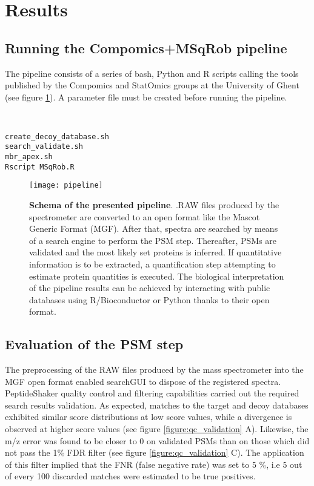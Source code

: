 \section{Results}

\subsection{Running the Compomics+MSqRob pipeline}

The pipeline consists of a series of bash, Python and R scripts calling the tools published by the Compomics and StatOmics groups at the University of Ghent (see figure \ref{fig:pipeline}). A parameter file must be created before running the pipeline.

\begin{verbatim}


create_decoy_database.sh
search_validate.sh
mbr_apex.sh
Rscript MSqRob.R

\end{verbatim}


\begin{figure}[!h]
\texttt{[image: pipeline]}
\caption[Schema of the presented pipeline]{\textbf{Schema of the presented pipeline}. .RAW files produced by the spectrometer are converted to an open format like the Mascot Generic Format (\ac{MGF}). After that, spectra are searched by means of a search engine to perform the PSM step. Thereafter, PSMs are validated and the most likely set proteins is inferred. If quantitative information is to be extracted, a quantification step attempting to estimate protein quantities is executed. The biological interpretation of the pipeline results can be achieved by interacting with public databases using R/Bioconductor or Python thanks to their open format.}
\label{fig:pipeline}
\end{figure}

\subsection{Evaluation of the PSM step}

The preprocessing of the RAW files produced by the mass spectrometer into the MGF open format enabled searchGUI to dispose of the registered spectra. PeptideShaker quality control and filtering capabilities carried out the required search results validation. As expected, matches to the target and decoy databases exhibited similar score distributions at low score values, while a divergence is observed at higher score values (see figure \ref{figure:qc_validation} A). Likewise, the m/z error was found to be closer to 0 on validated PSMs than on those which did not pass the 1\% FDR filter (see figure \ref{figure:qc_validation} C). The application of this filter implied that the FNR (false negative rate) was set to 5 \%, i.e 5 out of every 100 discarded matches were estimated to be true positives.



